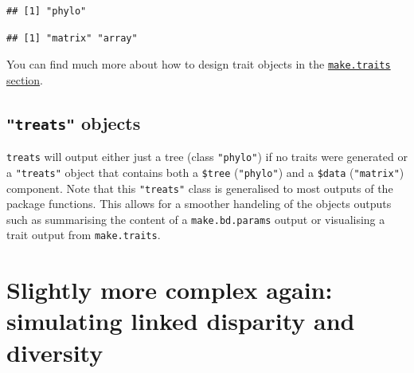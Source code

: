 \documentclass[
]{book}
\newenvironment{Shaded}{\begin{snugshade}}{\end{snugshade}}
\newcommand{\CommentTok}[1]{\textcolor[rgb]{0.56,0.35,0.01}{\textit{#1}}}
\newcommand{\KeywordTok}[1]{\textcolor[rgb]{0.13,0.29,0.53}{\textbf{#1}}}
\newcommand{\NormalTok}[1]{#1}
\newcommand{\OperatorTok}[1]{\textcolor[rgb]{0.81,0.36,0.00}{\textbf{#1}}}
\newcommand{\StringTok}[1]{\textcolor[rgb]{0.31,0.60,0.02}{#1}}
\begin{document}
\begin{Shaded}
\end{Shaded}

\begin{verbatim}
## [1] "phylo"
\end{verbatim}

\begin{Shaded}
\end{Shaded}

\begin{verbatim}
## [1] "matrix" "array"
\end{verbatim}

You can find much more about how to design trait objects in the \protect\hyperlink{maketraits}{\texttt{make.traits} section}.

\hypertarget{treats-objects}{%
\subsection{\texorpdfstring{\texttt{"treats"} objects}{"treats" objects}}\label{treats-objects}}

\texttt{treats} will output either just a tree (class \texttt{"phylo"}) if no traits were generated or a \texttt{"treats"} object that contains both a \texttt{\$tree} (\texttt{"phylo"}) and a \texttt{\$data} (\texttt{"matrix"}) component.
Note that this \texttt{"treats"} class is generalised to most outputs of the package functions.
This allows for a smoother handeling of the objects outputs such as summarising the content of a \texttt{make.bd.params} output or visualising a trait output from \texttt{make.traits}.

\hypertarget{slightly-more-complex-again-simulating-linked-disparity-and-diversity}{%
\section{Slightly more complex again: simulating linked disparity and diversity}\label{slightly-more-complex-again-simulating-linked-disparity-and-diversity}}
\end{document}
